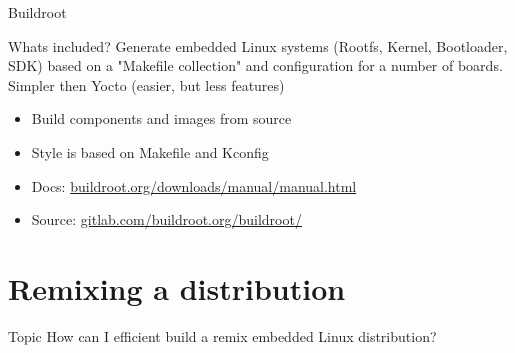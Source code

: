 \documentclass{beamer}
\begin{document}
\begin{frame}{Buildroot}
	\begin{block}{Whats included?}
		Generate embedded Linux systems (Rootfs, Kernel, Bootloader, SDK)  based on a "Makefile collection" and configuration for a number of boards. Simpler then Yocto (easier, but less features)
	\end{block}

	\begin{itemize}
		\item Build components and images from source
		\item Style is based on Makefile and Kconfig 
		\item Docs: \href{https://buildroot.org/downloads/manual/manual.html}{buildroot.org/downloads/manual/manual.html}
		\item Source: \href{https://gitlab.com/buildroot.org/buildroot/}{gitlab.com/buildroot.org/buildroot/}
	\end{itemize}
\end{frame}

\section{Remixing a distribution}

\begin{frame}
	\begin{block}{Topic}
		How can I efficient build a remix embedded Linux distribution?
	\end{block}
\end{frame}
\end{document}
